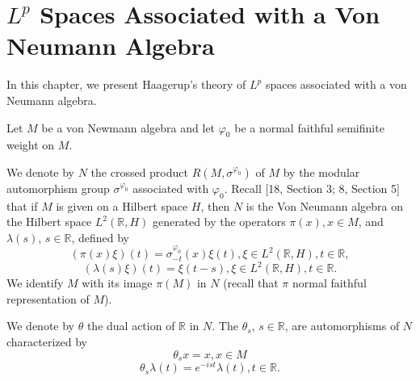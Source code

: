 
% 
\chapter{$L^p$ Spaces Associated with a Von Neumann Algebra}
In this chapter, we present Haagerup's theory of $L^p$ spaces associated with a von Neumann algebra.\par 
Let $M$ be a von Newmann algebra and let $\varphi_0$ be a normal faithful semifinite weight on $M$.\par 
We denote by $N$ the crossed product $R(M,\sigma^{\varphi_0})$ of $M$ by the modular automorphism group $\sigma^{\varphi_0}$ associated with $\varphi_0$. Recall [18, Section 3; 8, Section 5] that if $M$ is given on a Hilbert space $H$, then $N$ is the Von Neumann algebra on the Hilbert space $L^2(\mathbb{R},H)$ generated by the operators $\pi(x),x\in M$, and $\lambda(s)$, $s\in \mathbb{R}$, defined by
\begin{equation}
    (\pi(x)\xi)(t)=\sigma_{-t}^{\varphi_0}(x)\xi(t),\xi\in L^2(\mathbb{R},H),t\in \mathbb{R},  
\end{equation}
\begin{equation}
    (\lambda(s)\xi)(t)=\xi(t-s),\xi\in L^2(\mathbb{R},H),t\in \mathbb{R}. 
\end{equation}
We identify $M$ with its image $\pi(M)$ in $N$ (recall that $\pi$ normal faithful representation of $M$).\par 
We denote by $\theta$ the dual action of $\mathbb{R}$ in $N$. The $\theta_s$, $s\in \mathbb{R}$, are automorphisms of $N$ characterized by
\begin{equation}\label{Chap2: eqn: 3}
    \theta_s x=x, x\in M
\end{equation} 
\begin{equation}
    \theta_s\lambda(t)=e^{-ist}\lambda(t),t\in \mathbb{R}.
\end{equation}
